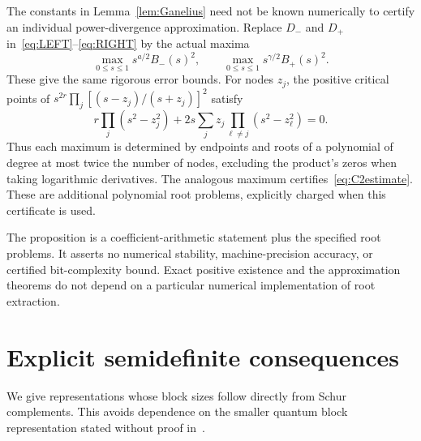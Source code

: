 \documentclass[11pt]{article}
\numberwithin{equation}{section}
\begin{document}
The constants in Lemma~\ref{lem:Ganelius} need not be known numerically
to certify an individual power-divergence approximation. Replace $D_-$
and $D_+$ in~\eqref{eq:LEFT}--\eqref{eq:RIGHT} by the actual maxima
\[
 \max_{0\le s\le1}s^{a/2}B_-(s)^2,
 \qquad \max_{0\le s\le1}s^{\gamma/2}B_+(s)^2.
\]
These give the same rigorous error bounds. For nodes $z_j$, the positive
critical points of $s^{2r}\prod_j[(s-z_j)/(s+z_j)]^2$ satisfy
\begin{equation}\label{eq:certificatePolynomial}
 r\prod_j(s^2-z_j^2)+2s\sum_j z_j
                       \prod_{\ell\ne j}(s^2-z_\ell^2)=0.
\end{equation}
Thus each maximum is determined by endpoints and roots of a polynomial
of degree at most twice the number of nodes, excluding the product's
zeros when taking logarithmic derivatives. The analogous maximum
certifies~\eqref{eq:C2estimate}. These are additional polynomial root
problems, explicitly charged when this certificate is used.

The proposition is a coefficient-arithmetic statement plus the specified
root problems. It asserts no numerical stability, machine-precision
accuracy, or certified bit-complexity bound. Exact positive existence
and the approximation theorems do not depend on a particular numerical
implementation of root extraction.

\section{Explicit semidefinite consequences}

We give representations whose block sizes follow directly from Schur
complements. This avoids dependence on the smaller quantum block
representation stated without proof in~\cite[Theorem~5]{FF}.
\end{document}

